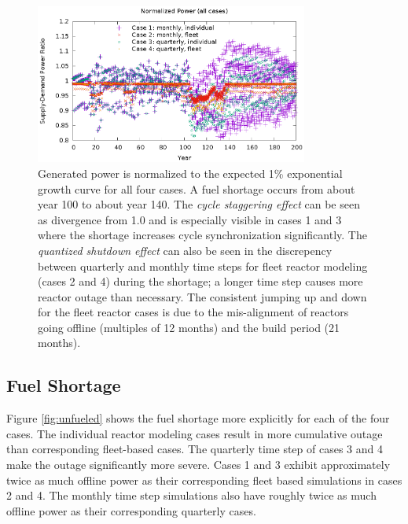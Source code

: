 \documentclass{style}
\begin{document}
\begin{figure}[!h]
    \centering
    \includegraphics[width=0.8\textwidth]{exp2/power-rel.eps}
    \caption[Normalized power]{
        Generated power is normalized to the expected 1\% exponential growth
        curve for all four cases.  A fuel shortage occurs from about year 100
        to about year 140.  The \emph{cycle staggering effect} can be seen as
        divergence from 1.0 and is especially visible in cases 1 and 3 where
        the shortage increases cycle synchronization significantly. The
        \emph{quantized shutdown effect} can also be seen in the discrepency
        between quarterly and monthly time steps for fleet reactor modeling
        (cases 2 and 4) during the shortage; a longer time step causes more
        reactor outage than necessary. The consistent jumping up and down for
        the fleet reactor cases is due to the mis-alignment of reactors going
        offline (multiples of 12 months) and the build period (21 months).
    }
    \label{fig:power-rel}
\end{figure}

\subsection{Fuel Shortage}

Figure \ref{fig:unfueled} shows the fuel shortage more explicitly
for each of the four cases. The individual reactor modeling cases result in
more cumulative outage than corresponding fleet-based cases. The quarterly
time step of cases 3 and 4 make the outage significantly more severe. Cases 1
and 3 exhibit approximately twice as much offline power as their corresponding
fleet based simulations in cases 2 and 4.  The monthly time step simulations
also have roughly twice as much offline power as their corresponding quarterly
cases.
\end{document}
